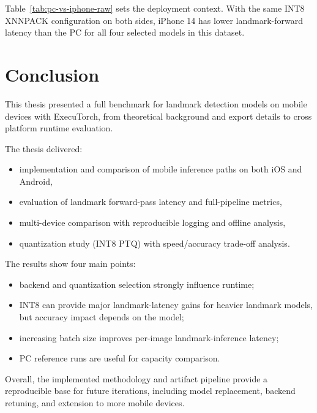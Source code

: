 Table~\ref{tab:pc-vs-iphone-raw} sets the deployment context. With the same
INT8 XNNPACK configuration on both sides, iPhone 14 has lower landmark-forward
latency than the PC for all four selected models in this dataset.

\chapter{Conclusion}

This thesis presented a full benchmark for landmark detection models on mobile devices
with ExecuTorch, from theoretical background and export details to
cross platform runtime evaluation.

The thesis delivered:
\begin{itemize}
    \item implementation and comparison of mobile inference paths on both iOS
          and Android,
    \item evaluation of landmark forward-pass latency and full-pipeline metrics,
    \item multi-device comparison with reproducible logging and offline analysis,
    \item quantization study (INT8 PTQ) with speed/accuracy trade-off analysis.
\end{itemize}

The results show four main points:
\begin{itemize}
    \item backend and quantization selection strongly influence runtime;
    \item INT8 can provide major landmark-latency gains for heavier landmark
          models, but accuracy impact depends on the model;
    \item increasing batch size improves per-image landmark-inference latency;
    \item PC reference runs are useful for capacity comparison.
\end{itemize}

Overall, the implemented methodology and artifact pipeline provide a
reproducible base for future iterations, including model replacement, backend
retuning, and extension to more mobile devices.

